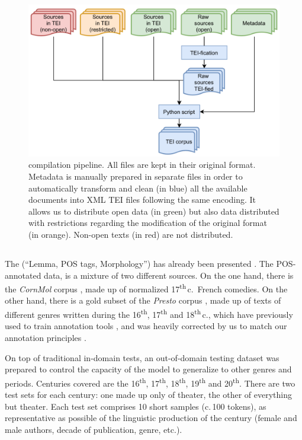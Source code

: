 \begin{figure}[ht]
    \centering
    \includegraphics[width=0.75\linewidth]{static/media/mod_eval/dalembert/corpus_trans.png}
    \caption{\freemmax compilation pipeline. All files are kept in their original format. Metadata is manually prepared in separate files in order to automatically transform and clean (in blue) all the available documents into XML TEI files following the same encoding. It allows us to distribute open data (in green) but also data distributed with restrictions regarding the modification of the original format (in orange). Non-open texts (in red) are not distributed.}
    \label{fig:pipeline}
\end{figure}

\subsection{\texorpdfstring{\freemlpm}{FREEM LPM}}\label{freem_lpm}

The \freemlpm (``Lemma, POS tags, Morphology'') has already been presented \cite{gabay-etal-2020-standardizing}. The POS-annotated data, is a mixture of two different sources. On the one hand, there is the \emph{CornMol} corpus \cite{camps-etal-2021-corpus}, made up of normalized 17\textsuperscript{th}\,c.~French comedies. On the other hand, there is a gold subset of the \emph{Presto} corpus \cite{blumenthal-etal-2017-presto}, made up of texts of different genres written during the 16\textsuperscript{th}, 17\textsuperscript{th} and 18\textsuperscript{th}\,c., which have previously used to train annotation tools \cite{diwersy-etal-2017-ressources}, and was heavily corrected by us to match our annotation principles \cite{gabay-etal-2020-manuel}.

On top of traditional in-domain tests, an out-of-domain testing dataset was prepared to control the capacity of the model to generalize to other genres and periods. Centuries covered are the 16\textsuperscript{th}, 17\textsuperscript{th}, 18\textsuperscript{th}, 19\textsuperscript{th} and 20\textsuperscript{th}. There are two test sets for each century: one made up only of theater, the other of everything but theater. Each test set comprises 10 short samples (c.\,100 tokens), as representative as possible of the linguistic production of the century (female and male authors, decade of publication, genre, etc.).

